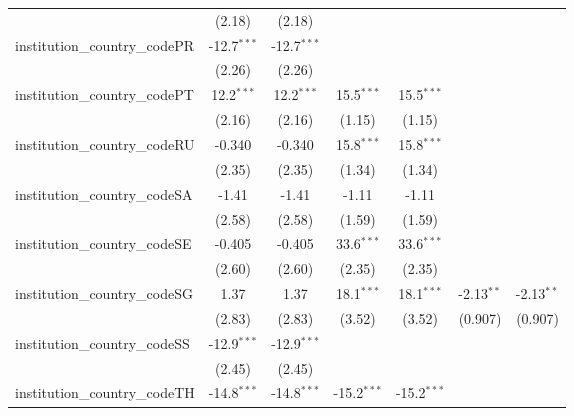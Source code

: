 \begin{tabular}{lcccccc}
                                         & (2.18)        & (2.18)        &               &               &               &   \\   
   institution\_country\_codePR          & -12.7$^{***}$ & -12.7$^{***}$ &               &               &               &   \\   
                                         & (2.26)        & (2.26)        &               &               &               &   \\   
   institution\_country\_codePT          & 12.2$^{***}$  & 12.2$^{***}$  & 15.5$^{***}$  & 15.5$^{***}$  &               &   \\   
                                         & (2.16)        & (2.16)        & (1.15)        & (1.15)        &               &   \\   
   institution\_country\_codeRU          & -0.340        & -0.340        & 15.8$^{***}$  & 15.8$^{***}$  &               &   \\   
                                         & (2.35)        & (2.35)        & (1.34)        & (1.34)        &               &   \\   
   institution\_country\_codeSA          & -1.41         & -1.41         & -1.11         & -1.11         &               &   \\   
                                         & (2.58)        & (2.58)        & (1.59)        & (1.59)        &               &   \\   
   institution\_country\_codeSE          & -0.405        & -0.405        & 33.6$^{***}$  & 33.6$^{***}$  &               &   \\   
                                         & (2.60)        & (2.60)        & (2.35)        & (2.35)        &               &   \\   
   institution\_country\_codeSG          & 1.37          & 1.37          & 18.1$^{***}$  & 18.1$^{***}$  & -2.13$^{**}$  & -2.13$^{**}$\\   
                                         & (2.83)        & (2.83)        & (3.52)        & (3.52)        & (0.907)       & (0.907)\\   
   institution\_country\_codeSS          & -12.9$^{***}$ & -12.9$^{***}$ &               &               &               &   \\   
                                         & (2.45)        & (2.45)        &               &               &               &   \\   
   institution\_country\_codeTH          & -14.8$^{***}$ & -14.8$^{***}$ & -15.2$^{***}$ & -15.2$^{***}$ &               &   \\   

\end{tabular}
